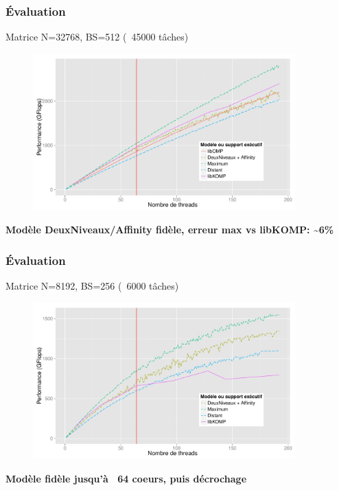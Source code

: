 \documentclass[xcolor={usenames,dvipsnames,svgnames,table}, aspectratio=43]{beamer}
\begin{document}
\begin{frame}
  \frametitle{Évaluation}
  Matrice N=32768, BS=512 (~45000 tâches)
  \begin{figure}
    \includegraphics[width=0.9\textwidth]{graph/simu_affinity_runtime_idchire.pdf}%
  \end{figure}

  \textbf{Modèle DeuxNiveaux/Affinity fidèle, erreur max vs libKOMP: \textasciitilde6\%}

\end{frame}

\begin{frame}
  \frametitle{Évaluation}
  Matrice N=8192, BS=256 (~6000 tâches)
  \begin{figure}
    \includegraphics[width=0.9\textwidth]{graph/simu_affinity_8k_runtime_idchire.pdf}%
  \end{figure}

  \textbf{Modèle fidèle jusqu'à ~64 coeurs, puis décrochage}

\end{frame}
\end{document}
